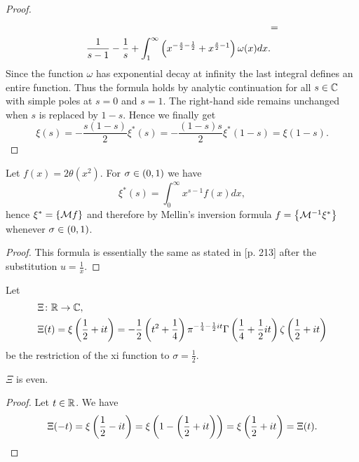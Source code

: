 \begin{proof}
\begin{equation*}
\begin{aligned}
	&= \\
		\frac{1}{s - 1} - \frac{1}{s} + \int _1 ^\infty \left(x^{-\frac{s}{2} - \frac{1}{2}} + x^{\frac{s}{2} - 1}\right) \omega(x) dx &.
\end{aligned}
\end{equation*}
	Since the function $\omega$ has exponential decay at infinity the last integral defines an entire function. Thus the formula holds by analytic continuation for all $s \in \mathbb{C}$ with simple poles at $s = 0$ and $s = 1$. The right-hand side remains unchanged when $s$ is replaced by $1 - s$. Hence we finally get
\begin{equation*}
	\xi(s) = -\frac{s(1 - s)}{2} \xi^*(s) = -\frac{(1 - s)s}{2} \xi^*(1 - s) = \xi(1 - s).
\end{equation*}
\end{proof}


\begin{lemma}\label{lem:XiMellin}
	Let $f(x) = 2 \theta(x^2)$. For $\sigma \in \left(0, 1\right)$ we have
\begin{equation*}
	\xi^*(s) = \int _0 ^\infty x^{s - 1} f(x) dx,
\end{equation*}
	hence $\xi^* = \left\{\mathcal{M} f\right\}$ and therefore by Mellin's inversion formula $f = \left\{\mathcal{M}^{-1} \xi^*\right\}$ whenever $\sigma \in \left(0, 1\right)$.
\end{lemma}
\begin{proof}
	This formula is essentially the same as stated in \cite{Edwards1974} [p. 213] after the substitution $u = \frac{1}{x}$.
\end{proof}


\begin{definition}
	Let
\begin{equation*}
\begin{aligned}
	&\Xi \colon \mathbb{R} \to \mathbb{C}, \\
	&\Xi(t) = \xi\left(\frac{1}{2} + it\right) = -\frac{1}{2}\left(t^2 + \frac{1}{4}\right) \pi ^{-\frac{1}{4} - \frac{1}{2} it} \Gamma\left(\frac{1}{4} + \frac{1}{2} it\right) \zeta\left(\frac{1}{2} + it\right)
\end{aligned}
\end{equation*}
	be the restriction of the xi function to $\sigma = \frac{1}{2}$.
\end{definition}


\begin{lemma}
	$\Xi$ is even.
\end{lemma}
\begin{proof}
	Let $t \in \mathbb{R}$. We have
\begin{equation*}
	\Xi(-t) = \xi\left(\frac{1}{2} - it\right) = \xi\left(1 - \left(\frac{1}{2} + it\right)\right) = \xi\left(\frac{1}{2} + it\right) = \Xi(t).
\end{equation*}
\end{proof}


